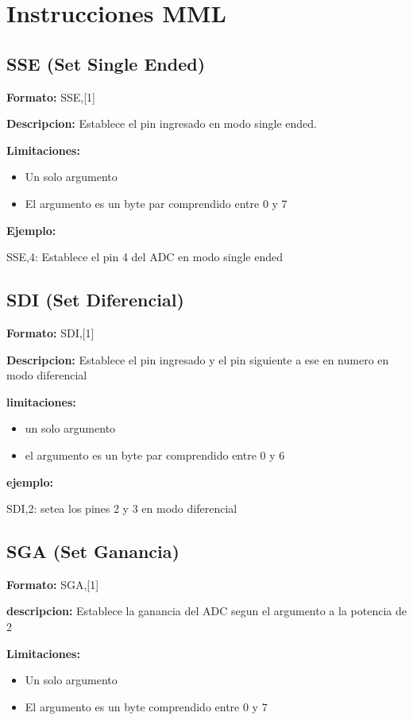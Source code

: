 \section{Instrucciones MML}\label{ap:instrucciones}

\subsection{SSE (Set Single Ended)}

\textbf{Formato:} SSE,[1]

\textbf{Descripcion:}
Establece el pin ingresado en modo single ended.

\textbf{Limitaciones:}
\begin{itemize}
  \item Un solo argumento
  \item El argumento es un byte par comprendido entre 0 y 7
\end{itemize}

\textbf{Ejemplo:}

SSE,4: Establece el pin 4 del ADC en modo single ended

\subsection{SDI (Set Diferencial)}

\textbf{Formato:} SDI,[1]

\textbf{Descripcion:}
Establece el pin ingresado y el pin siguiente a ese en numero en modo diferencial

\textbf{limitaciones:}
\begin{itemize}
  \item un solo argumento
  \item el argumento es un byte par comprendido entre 0 y 6
\end{itemize}

\textbf{ejemplo:}

SDI,2: setea los pines 2 y 3 en modo diferencial

\subsection{SGA (Set Ganancia)}

\textbf{Formato:} SGA,[1]

\textbf{descripcion:}
Establece la ganancia del ADC segun el argumento a la potencia de 2

\textbf{Limitaciones:}
\begin{itemize}
  \item Un solo argumento
  \item El argumento es un byte comprendido entre 0 y 7
\end{itemize}

